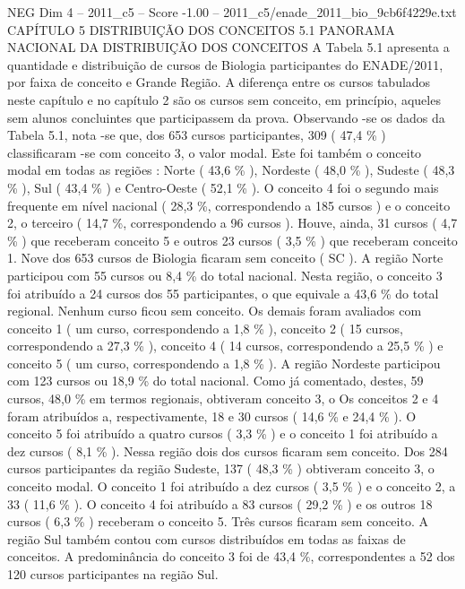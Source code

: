 \begin{textsample}{NEG Dim 4 – 2011\_c5 – Score -1.00 – 2011\_c5/enade\_2011\_bio\_9cb6f4229e.txt}  \label{ex:f4_neg_114}
CAPÍTULO 5 DISTRIBUIÇÃO DOS CONCEITOS 5.1 PANORAMA NACIONAL DA DISTRIBUIÇÃO DOS CONCEITOS A Tabela 5.1 apresenta a quantidade e distribuição de cursos de Biologia participantes do ENADE/2011, por faixa de conceito e Grande Região.
A diferença entre os cursos tabulados neste capítulo e no capítulo 2 são os cursos sem conceito, em princípio, aqueles sem alunos concluintes que participassem da prova.
Observando -se os dados da Tabela 5.1, nota -se que, dos 653 cursos participantes, 309 ( 47,4 \% ) classificaram -se com conceito 3, o valor modal.
Este foi também o conceito modal em todas as regiões : Norte ( 43,6 \% ), Nordeste ( 48,0 \% ), Sudeste ( 48,3 \% ), Sul ( 43,4 \% ) e Centro-Oeste ( 52,1 \% ).
O conceito 4 foi o segundo mais frequente em nível nacional ( 28,3 \%, correspondendo a 185 cursos ) e o conceito 2, o terceiro ( 14,7 \%, correspondendo a 96 cursos ).
Houve, ainda, 31 cursos ( 4,7 \% ) que receberam conceito 5 e outros 23 cursos ( 3,5 \% ) que receberam conceito 1.
Nove dos 653 cursos de Biologia ficaram sem conceito ( SC ).
A região Norte participou com 55 cursos ou 8,4 \% do total nacional.
Nesta região, o conceito 3 foi atribuído a 24 cursos dos 55 participantes, o que equivale a 43,6 \% do total regional.
Nenhum curso ficou sem conceito.
Os demais foram avaliados com conceito 1 ( um curso, correspondendo a 1,8 \% ), conceito 2 ( 15 cursos, correspondendo a 27,3 \% ), conceito 4 ( 14 cursos, correspondendo a 25,5 \% ) e conceito 5 ( um curso, correspondendo a 1,8 \% ).
A região Nordeste participou com 123 cursos ou 18,9 \% do total nacional.
Como já comentado, destes, 59 cursos, 48,0 \% em termos regionais, obtiveram conceito 3, o Os conceitos 2 e 4 foram atribuídos a, respectivamente, 18 e 30 cursos ( 14,6 \% e 24,4 \% ).
O conceito 5 foi atribuído a quatro cursos ( 3,3 \% ) e o conceito 1 foi atribuído a dez cursos ( 8,1 \% ).
Nessa região dois dos cursos ficaram sem conceito.
Dos 284 cursos participantes da região Sudeste, 137 ( 48,3 \% ) obtiveram conceito 3, o conceito modal.
O conceito 1 foi atribuído a dez cursos ( 3,5 \% ) e o conceito 2, a 33 ( 11,6 \% ).
O conceito 4 foi atribuído a 83 cursos ( 29,2 \% ) e os outros 18 cursos ( 6,3 \% ) receberam o conceito 5.
Três cursos ficaram sem conceito.
A região Sul também contou com cursos distribuídos em todas as faixas de conceitos.
A predominância do conceito 3 foi de 43,4 \%, correspondentes a 52 dos 120 cursos participantes na região Sul.

\end{textsample}
